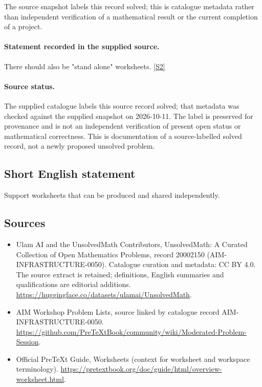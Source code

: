 \documentclass[11pt]{article}
\begin{document}
The source snapshot labels this record solved; this is catalogue metadata rather than independent verification of a mathematical result or the current completion of a project.
\paragraph{Statement recorded in the supplied source.}
There should also be "stand alone" worksheets. \href{https://github.com/PreTeXtBook/community/wiki/Moderated-Problem-Session}{[S2]}
\paragraph{Source status.}
The supplied catalogue labels this source record solved; that metadata was checked against the supplied snapshot on 2026-10-11. The label is preserved for provenance and is not an independent verification of present open status or mathematical correctness. This is documentation of a source-labelled solved record, not a newly proposed unsolved problem.
\subsection{Short English statement}
Support worksheets that can be produced and shared independently.
\subsection{Sources}
\begin{itemize}
\item[S1] Ulam AI and the UnsolvedMath Contributors, UnsolvedMath: A Curated Collection of Open Mathematics Problems, record 20002150 (AIM-INFRASTRUCTURE-0050). Catalogue curation and metadata: CC BY 4.0. The source extract is retained; definitions, English summaries and qualifications are editorial additions.
\url{https://huggingface.co/datasets/ulamai/UnsolvedMath}.
\item[S2] AIM Workshop Problem Lists, source linked by catalogue record AIM-INFRASTRUCTURE-0050.
\url{https://github.com/PreTeXtBook/community/wiki/Moderated-Problem-Session}.
\item[S3] Official PreTeXt Guide, Worksheets (context for worksheet and workspace terminology).
\url{https://pretextbook.org/doc/guide/html/overview-worksheet.html}.
\end{itemize}
\end{document}
